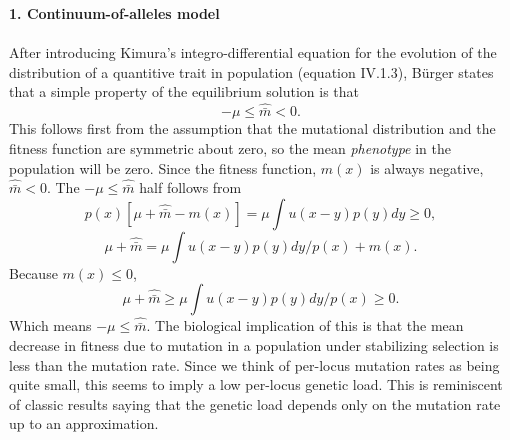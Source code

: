 \textbf{1. Continuum-of-alleles model}\\ \\
After introducing Kimura's integro-differential equation for the evolution of the distribution of a quantitive trait in
population (equation IV.1.3), B{\"u}rger states that a simple property of the equilibrium solution is that
\begin{equation}
-\mu \leq \hat{\bar{m}} < 0.
\end{equation}
This follows first from the assumption that the mutational distribution and the fitness function are symmetric about
zero, so the mean \emph{phenotype} in the population will be zero.  Since the fitness function, $m(x)$ is always
negative, $\hat{\bar{m}} < 0$. The $-\mu \leq \hat{\bar{m}}$ half follows from
\begin{equation}
p(x)\left[ \mu + \hat{\bar{m}} - m(x) \right] = \mu \int u(x-y) p(y) dy \geq 0,
\end{equation}
\begin{equation}
\mu + \hat{\bar{m}} = \mu \int u(x-y) p(y) dy / p(x) + m(x).
\end{equation}
Because $m(x) \leq 0$, 
\begin{equation}
\mu + \hat{\bar{m}} \geq \mu \int u(x-y) p(y) dy / p(x) \geq 0.
\end{equation}
Which means $-\mu \leq \hat{\bar{m}}$. The biological implication of this is that the mean decrease in fitness due to
mutation in a population under stabilizing selection is less than the mutation rate. Since we think of per-locus
mutation rates as being quite small, this seems to imply a low per-locus genetic load. This is reminiscent of classic
results saying that the genetic load depends only on the mutation rate up to an approximation.

